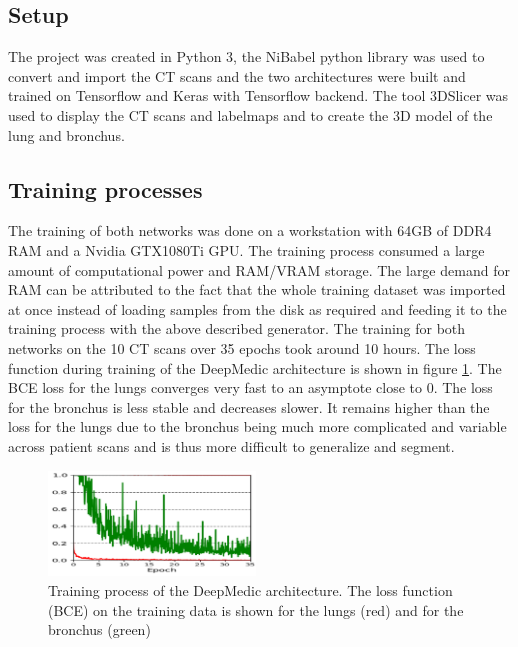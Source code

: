 
\subsection{Setup}

The project was created in Python 3, the NiBabel python library was used to convert and import the CT scans and the two architectures were built and trained on Tensorflow and Keras with Tensorflow backend. The tool 3DSlicer was used to display the CT scans and labelmaps and to create the 3D model of the lung and bronchus.

\subsection{Training processes}
The training of both networks was done on a workstation with 64GB of DDR4 RAM and a Nvidia GTX1080Ti GPU. The training process consumed a large amount of computational power and RAM/VRAM storage. The large demand for RAM can be attributed to the fact that the whole training dataset was imported at once instead of loading samples from the disk as required and feeding it to the training process with the above described generator. The training for both networks on the 10 CT scans over 35 epochs took around 10 hours.\newline 
The loss function during training of the DeepMedic architecture is shown in figure \ref{train_deepmedic}. The BCE loss for the lungs converges very fast to an asymptote close to 0. The loss for the bronchus is less stable and decreases slower. It remains higher than the loss for the lungs due to the bronchus being much more complicated and variable across patient scans and is thus more difficult to generalize and segment.\newline
\begin{figure}[h!]
	\includegraphics[width=0.49\textwidth, angle=0]{files/deepmedictrain.png}
	\caption{Training process of the DeepMedic architecture. The loss function (BCE) on the training data is shown for the lungs (red) and for the bronchus (green)}
	\label{train_deepmedic}
\end{figure}

